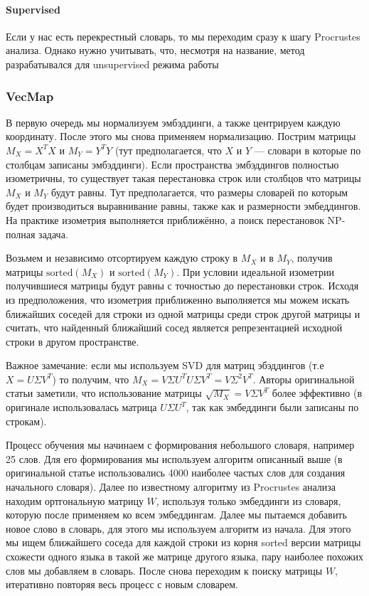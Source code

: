 \documentclass{article}
\begin{document}
    \paragraph{Supervised}

    \quad

    Если у нас есть перекрестный словарь, то мы переходим сразу к шагу Procrustes анализа. Однако нужно учитывать, что, несмотря 
    на название, метод разрабатывался для unsupervised режима работы

    \subsubsection{VecMap}

    В первую очередь мы нормализуем эмбэддинги, а также центрируем каждую координату. После этого мы снова применяем 
    нормализацию. Пострим матрицы $M_{X} = X^{T} X$ и $M_{Y} = Y^{T}Y$ (тут предполагается, что $X$ и $Y$ --- словари в которые по столбцам записаны эмбэддинги).
    Если пространства эмбэддингов полностью изометричны, то существует такая перестановка строк или столбцов что матрицы $M_{X}$ и $M_{Y}$ будут равны.
    Тут предполагается, что размеры словарей по которым будет производиться выравнивание равны, также как и размерности эмбеддингов. 
    На практике изометрия выполняется приближённо, а поиск перестановок NP-полная задача. 

    Возьмем и независимо отсортируем каждую строку в $M_{X}$ и в $M_{Y}$, получив матрицы $\text{sorted}(M_{X})$
    и $\text{sorted}(M_{Y})$. 
    При условии идеальной изометрии получившиеся матрицы 
    будут равны с точностью до перестановки строк. Исходя из предположения, что изометрия приближенно выполняется
    мы можем искать ближайших соседей для строки из одной матрицы среди строк другой матрицы и считать, что найденный ближайший сосед 
    является репрезентацией исходной строки в другом пространстве. 

    Важное замечание: если мы используем SVD для матриц эбэддингов (т.е $X = U \Sigma V^{T}$) 
    то получим, что $M_{X} = V \Sigma U^{T}  U \Sigma V^{T} = V \Sigma^{2} V^{T}$. Авторы оригинальной 
    статьи заметили, что использование матрицы $\sqrt{M_{X}} = V \Sigma V^{T}$ более эффективно 
    (в оригинале использовалась матрица $U \Sigma U^{T}$, так как эмбеддинги были записаны по строкам).

    Процесс обучения мы начинаем с формирования небольшого словаря, например 25 слов. Для его формирования мы используем алгоритм описанный выше 
    (в оригинальной статье использовались 4000 наиболее частых слов для создания начального словаря). 
    Далее по известному алгоритму из Procrustes анализа находим 
    ортгональную матрицу $W$, используя только эмбеддинги из словаря, которую после применяем ко всем эмбеддингам. 
    Далее мы пытаемся добавить новое слово 
    в словарь, для этого мы используем алгоритм из начала. 
    Для этого мы ищем ближайшего соседа для каждой строки из корня sorted версии матрицы схожести 
    одного языка в такой же матрице другого языка, пару наиболее похожих слов мы добавляем в словарь. 
    После снова переходим к поиску матрицы $W$, итеративно повторяя весь процесс с новым словарем.
\end{document}
